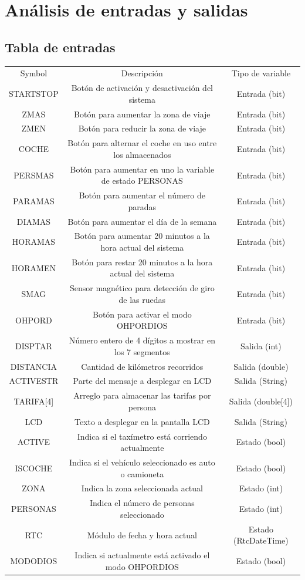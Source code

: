 \documentclass[a4paper,11pt]{article}
\begin{document}
\section*{Análisis de entradas y salidas}

\subsection*{Tabla de entradas}

\begin{tabular}{ccc}
	Symbol & Descripción & Tipo de variable \\
	STARTSTOP & Botón de activación y desactivación del sistema & Entrada (bit) \\
	ZMAS & Botón para aumentar la zona de viaje & Entrada (bit) \\
	ZMEN & Botón para reducir la zona de viaje & Entrada (bit) \\
	COCHE & Botón para alternar el coche en uso entre los almacenados & Entrada (bit) \\
	PERSMAS & Botón para aumentar en uno la variable de estado PERSONAS & Entrada (bit) \\
	PARAMAS & Botón para aumentar el número de paradas & Entrada (bit) \\
	DIAMAS & Botón para aumentar el día de la semana & Entrada (bit) \\
	HORAMAS & Botón para aumentar 20 minutos a la hora actual del sistema & Entrada (bit) \\
	HORAMEN & Botón para restar 20 minutos a la hora actual del sistema & Entrada (bit) \\
	SMAG & Sensor magnético para detección de giro de las ruedas & Entrada (bit) \\
	OHPORD & Botón para activar el modo OHPORDIOS & Entrada (bit) \\
	DISPTAR & Número entero de 4 dígitos a mostrar en los 7 segmentos & Salida (int) \\
	DISTANCIA & Cantidad de kilómetros recorridos & Salida (double) \\
	ACTIVESTR & Parte del mensaje a desplegar en LCD & Salida (String) \\
	TARIFA[4] & Arreglo para almacenar las tarifas por persona & Salida (double[4]) \\
	LCD & Texto a desplegar en la pantalla LCD & Salida (String) \\
	ACTIVE & Indica si el taxímetro está corriendo actualmente & Estado (bool) \\
	ISCOCHE & Indica si el vehículo seleccionado es auto o camioneta & Estado (bool) \\
	ZONA & Indica la zona seleccionada actual & Estado (int) \\
	PERSONAS & Indica el número de personas seleccionado & Estado (int) \\
	RTC & Módulo de fecha y hora actual & Estado (RtcDateTime) \\
	MODODIOS & Indica si actualmente está activado el modo OHPORDIOS & Estado (bool) \\
	\end{tabular}
\end{document}

